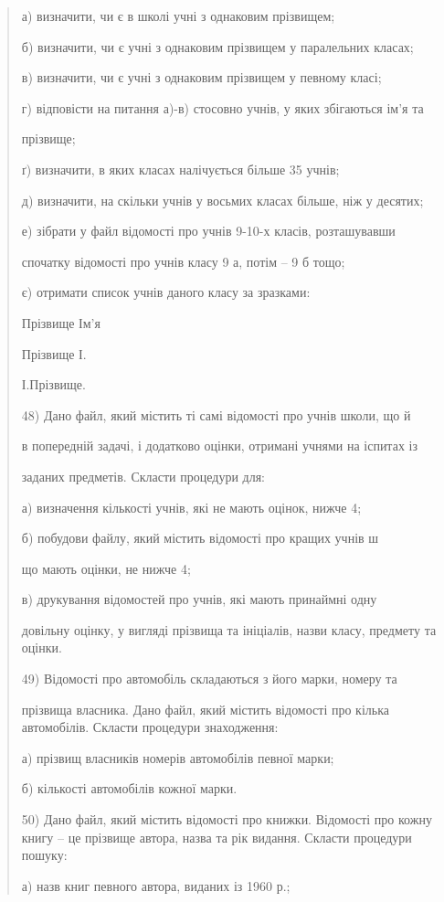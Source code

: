 \documentclass[]{article}
\begin{document}
\begin{quote}
а) визначити, чи є в школі учні з однаковим прізвищем;

б) визначити, чи є учні з однаковим прізвищем у паралельних класах;

в) визначити, чи є учні з однаковим прізвищем у певному класі;

г) відповісти на питання а)-в) стосовно учнів, у яких збігаються ім'я та

прізвище;

ґ) визначити, в яких класах налічується більше 35 учнів;

д) визначити, на скільки учнів у восьмих класах більше, ніж у десятих;

е) зібрати у файл відомості про учнів 9-10-х класів, розташувавши

спочатку відомості про учнів класу 9 а, потім -- 9 б тощо;

є) отримати список учнів даного класу за зразками:

Прізвище Ім'я

Прізвище І.

І.Прізвище.

48) Дано файл, який містить ті самі відомості про учнів школи, що й

в попередній задачі, і додатково оцінки, отримані учнями на іспитах із

заданих предметів. Скласти процедури для:

а) визначення кількості учнів, які не мають оцінок, нижче 4;

б) побудови файлу, який містить відомості про кращих учнів ш

що мають оцінки, не нижче 4;

в) друкування відомостей про учнів, які мають принаймні одну

довільну оцінку, у вигляді прізвища та ініціалів, назви класу, предмету
та оцінки.

49) Відомості про автомобіль складаються з його марки, номеру та

прізвища власника. Дано файл, який містить відомості про кілька
автомобілів. Скласти процедури знаходження:

а) прізвищ власників номерів автомобілів певної марки;

б) кількості автомобілів кожної марки.

50) Дано файл, який містить відомості про книжки. Відомості про кожну
книгу -- це прізвище автора, назва та рік видання. Скласти процедури
пошуку:

а) назв книг певного автора, виданих із 1960 р.;


\end{quote}
\end{document}
